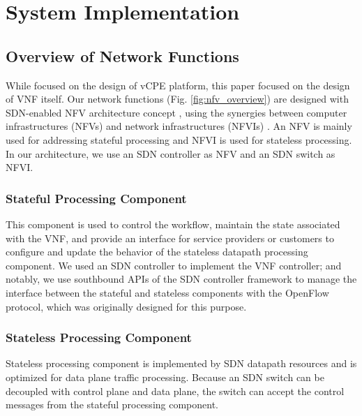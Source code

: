 \chapter{System Implementation} \label{ch:implementation}
\section{Overview of Network Functions} \label{sec:desc_nfv_overview}

While \cite{che-wei-master} focused on the design of vCPE platform, this paper focused on the design of VNF itself.
Our network functions (Fig. \ref{fig:nfv_overview}) are designed with SDN-enabled NFV architecture concept \cite{sdn-enabled}, using the synergies between computer infrastructures (NFVs) and network infrastructures (NFVIs) \cite{etsi-nfv-terminology, etsi-nfv-infra}.
An NFV is mainly used for addressing stateful processing and NFVI is used for stateless processing.
In our architecture, we use an SDN controller as NFV and an SDN switch as NFVI.


\subsection{Stateful Processing Component}
This component is used to control the workflow, maintain the state associated with the VNF, and provide an interface for service providers or customers to configure and update the behavior of the stateless datapath processing component.
We used an SDN controller to implement the VNF controller; and notably, we use southbound APIs of the SDN controller framework to manage the interface between the stateful and stateless components with the OpenFlow protocol, which was originally designed for this purpose.


\subsection{Stateless Processing Component}
Stateless processing component is implemented by SDN datapath resources and is optimized for data plane traffic processing.
Because an SDN switch can be decoupled with control plane and data plane, the switch can accept the control messages from the stateful processing component.

